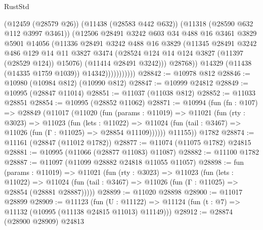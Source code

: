 \begin{lexlean}{RustStd}
\begin{coremodule}
                            (@12459 (@28579 @26))
                            (@11438 (@28583 @442 @632))
                            (@11318 (@28590 @632 @112 @3997 @3461))
                            (@12506
                              @28491
                              @3242
                              @603
                              @34
                              @488
                              @16
                              @3461
                              @3829
                              @5901
                              @14056
                              (@11336
                                @28491
                                @3242
                                @488
                                @16
                                @3829
                                (@11345
                                  @28491
                                  @3242
                                  @486
                                  @129
                                  @14
                                  @11
                                  @3827
                                  @3474
                                  (@28524 @124 @14 @124 @3827 (@11397 (@28529 @124)) @15076)
                                  (@11414 @28491 @3242)))
                              @28768))
                          @14329
                          (@11438 (@14335 @1759 @1039))
                          @14342)))))))))))
@28842 := @10978 @812
@28846 := @10980 (@10984 @812) (@10990 @812)
@28847 := @10999 @24812
@28849 := @10995 (@28847 @11014)
@28851 := @11037 (@11038 @812)
@28852 := @11033 @28851
@28854 := @10995 (@28852 @11062)
@28871 := @10994
    (fun (fn : @107) =>
    @28849
      (@11017
        (@11020
          (fun (params : @11019) =>
          @11021
            (fun (rty : @3023) =>
            @11023
              (fun (lets : @11022) =>
              @11024 (fun (tail : @3467) => @11026 (fun (Γ : @11025) => @28854 @11109))))))
        @11155))
    @1782
@28874 := @11161 (@28847 (@11012 @1782))
@28877 := @11074 (@11075 @1782) @24815
@28881 := @10995 (@11066 (@28877 @11083) @11087)
@28882 := @11100 @1782
@28887 := @11097 (@11099 @28882 @24818 @11055 @11057)
@28898 := fun (params : @11019) =>
  @11021
    (fun (rty : @3023) =>
    @11023
      (fun (lets : @11022) =>
      @11024 (fun (tail : @3467) => @11026 (fun (Γ : @11025) => @28854 (@28881 @28887)))))
@28899 := @11020 @28898
@28900 := @11017 @28899
@28909 := @11123
    (fun (U : @11122) => @11124 (fun (t : @7) => @11132 (@10995 (@11138 @24815 @11013) @11149)))
@28912 := @28874 (@28900 @28909) @24813

\end{coremodule}
\end{lexlean}
